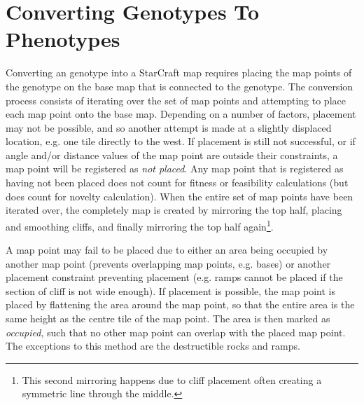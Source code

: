 \section{Converting Genotypes To Phenotypes}
\label{methodology_conversion}
Converting an genotype into a StarCraft map requires placing the map points of the genotype on the base map that is connected to the genotype. The conversion process consists of iterating over the set of map points and attempting to place each map point onto the base map. Depending on a number of factors, placement may not be possible, and so another attempt is made at a slightly displaced location, e.g. one tile directly to the west. If placement is still not successful, or if angle and/or distance values of the map point are outside their constraints, a map point will be registered as \textit{not placed}. Any map point that is registered as having not been placed does not count for fitness or feasibility calculations (but does count for novelty calculation). When the entire set of map points have been iterated over, the completely map is created by mirroring the top half, placing and smoothing cliffs, and finally mirroring the top half again\footnote{This second mirroring happens due to cliff placement often creating a symmetric line through the middle.}. 

A map point may fail to be placed due to either an area being occupied by another map point (prevents overlapping map points, e.g. bases) or another placement constraint preventing placement (e.g. ramps cannot be placed if the section of cliff is not wide enough). If placement is possible, the map point is placed by flattening the area around the map point, so that the entire area is the same height as the centre tile of the map point. The area is then marked as \textit{occupied}, such that no other map point can overlap with the placed map point. The exceptions to this method are the destructible rocks and ramps. 


